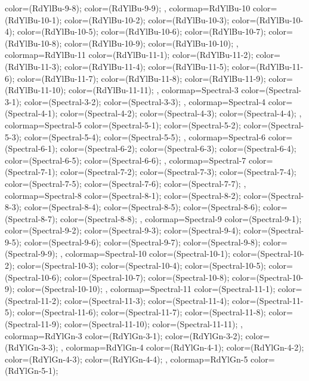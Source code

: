 {{  color=(RdYlBu-9-8);
  color=(RdYlBu-9-9);
},
colormap={RdYlBu-10}{
  color=(RdYlBu-10-1);
  color=(RdYlBu-10-2);
  color=(RdYlBu-10-3);
  color=(RdYlBu-10-4);
  color=(RdYlBu-10-5);
  color=(RdYlBu-10-6);
  color=(RdYlBu-10-7);
  color=(RdYlBu-10-8);
  color=(RdYlBu-10-9);
  color=(RdYlBu-10-10);
},
colormap={RdYlBu-11}{
  color=(RdYlBu-11-1);
  color=(RdYlBu-11-2);
  color=(RdYlBu-11-3);
  color=(RdYlBu-11-4);
  color=(RdYlBu-11-5);
  color=(RdYlBu-11-6);
  color=(RdYlBu-11-7);
  color=(RdYlBu-11-8);
  color=(RdYlBu-11-9);
  color=(RdYlBu-11-10);
  color=(RdYlBu-11-11);
},
colormap={Spectral-3}{
  color=(Spectral-3-1);
  color=(Spectral-3-2);
  color=(Spectral-3-3);
},
colormap={Spectral-4}{
  color=(Spectral-4-1);
  color=(Spectral-4-2);
  color=(Spectral-4-3);
  color=(Spectral-4-4);
},
colormap={Spectral-5}{
  color=(Spectral-5-1);
  color=(Spectral-5-2);
  color=(Spectral-5-3);
  color=(Spectral-5-4);
  color=(Spectral-5-5);
},
colormap={Spectral-6}{
  color=(Spectral-6-1);
  color=(Spectral-6-2);
  color=(Spectral-6-3);
  color=(Spectral-6-4);
  color=(Spectral-6-5);
  color=(Spectral-6-6);
},
colormap={Spectral-7}{
  color=(Spectral-7-1);
  color=(Spectral-7-2);
  color=(Spectral-7-3);
  color=(Spectral-7-4);
  color=(Spectral-7-5);
  color=(Spectral-7-6);
  color=(Spectral-7-7);
},
colormap={Spectral-8}{
  color=(Spectral-8-1);
  color=(Spectral-8-2);
  color=(Spectral-8-3);
  color=(Spectral-8-4);
  color=(Spectral-8-5);
  color=(Spectral-8-6);
  color=(Spectral-8-7);
  color=(Spectral-8-8);
},
colormap={Spectral-9}{
  color=(Spectral-9-1);
  color=(Spectral-9-2);
  color=(Spectral-9-3);
  color=(Spectral-9-4);
  color=(Spectral-9-5);
  color=(Spectral-9-6);
  color=(Spectral-9-7);
  color=(Spectral-9-8);
  color=(Spectral-9-9);
},
colormap={Spectral-10}{
  color=(Spectral-10-1);
  color=(Spectral-10-2);
  color=(Spectral-10-3);
  color=(Spectral-10-4);
  color=(Spectral-10-5);
  color=(Spectral-10-6);
  color=(Spectral-10-7);
  color=(Spectral-10-8);
  color=(Spectral-10-9);
  color=(Spectral-10-10);
},
colormap={Spectral-11}{
  color=(Spectral-11-1);
  color=(Spectral-11-2);
  color=(Spectral-11-3);
  color=(Spectral-11-4);
  color=(Spectral-11-5);
  color=(Spectral-11-6);
  color=(Spectral-11-7);
  color=(Spectral-11-8);
  color=(Spectral-11-9);
  color=(Spectral-11-10);
  color=(Spectral-11-11);
},
colormap={RdYlGn-3}{
  color=(RdYlGn-3-1);
  color=(RdYlGn-3-2);
  color=(RdYlGn-3-3);
},
colormap={RdYlGn-4}{
  color=(RdYlGn-4-1);
  color=(RdYlGn-4-2);
  color=(RdYlGn-4-3);
  color=(RdYlGn-4-4);
},
colormap={RdYlGn-5}{
  color=(RdYlGn-5-1);
}}
